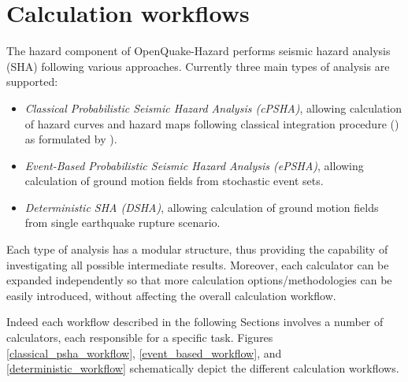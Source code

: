 \section{Calculation workflows}
The hazard component of OpenQuake-Hazard performs seismic hazard 
analysis (SHA) following various approaches. 
%
Currently three main types of analysis are supported:
\begin{itemize}
\item \textit{Classical Probabilistic Seismic Hazard Analysis (cPSHA)}, 
allowing calculation of hazard curves and hazard maps following 
classical integration procedure 
(\cite{cornell1968}) as formulated by \cite{field2003}).
\item \textit{Event-Based Probabilistic Seismic Hazard Analysis (ePSHA)}, 
allowing calculation of ground motion fields from stochastic event sets.
\item \textit{Deterministic SHA (DSHA)}, allowing calculation of ground motion 
fields from single earthquake rupture scenario.
\end{itemize}
Each type of analysis has a modular structure, thus providing the capability 
of investigating all possible intermediate results. Moreover, each calculator 
can be expanded independently so that more calculation options/methodologies 
can be easily introduced, without affecting the overall calculation workflow.

Indeed each workflow described in the following Sections involves a number 
of calculators, each responsible for a specific task. 
Figures \ref{classical_psha_workflow}, \ref{event_based_workflow}, and 
\ref{deterministic_workflow} schematically depict the different calculation 
workflows.
%
